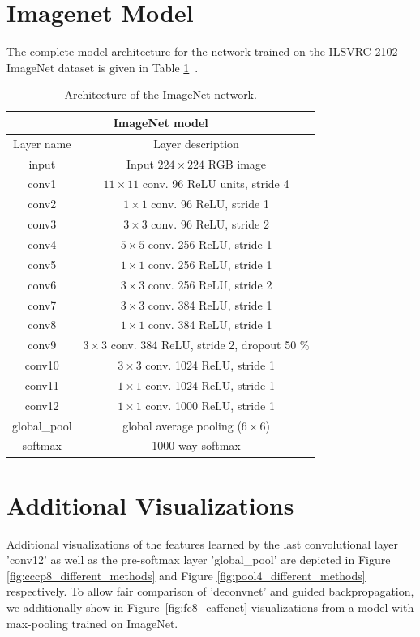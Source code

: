 \documentclass{article} %
\begin{document}
\begin{appendix}
\section{Imagenet Model}
The complete model architecture for the network trained on the ILSVRC-2102 ImageNet dataset is given in Table \ref{tbl:imagenet_net}~.
\newpage
\begin{table}[ht]
\caption{Architecture of the ImageNet network.}
\label{tbl:imagenet_net}
\begin{center}
\begin{tabular}{c|c}
\multicolumn{2}{c}{\textbf{ImageNet model}} \\ \hline
Layer name & Layer description \\ \hline
input & Input $224 \times 224$ RGB image\\
conv1 & $11 \times 11$ conv. 96 ReLU units, stride 4\\
conv2 & $1 \times 1$ conv. 96 ReLU, stride 1\\
conv3 & $3 \times 3$ conv. 96 ReLU, stride 2\\
conv4 & $5 \times 5$ conv. 256 ReLU, stride 1\\
conv5 & $1 \times 1$ conv. 256 ReLU, stride 1\\
conv6 & $3 \times 3$ conv. 256 ReLU, stride 2\\
conv7 & $3 \times 3$ conv. 384 ReLU, stride 1\\
conv8 & $1 \times 1$ conv. 384 ReLU, stride 1\\
conv9 & $3 \times 3$ conv. 384 ReLU, stride 2, dropout 50 \%\\
conv10 & $3 \times 3$ conv. 1024 ReLU, stride 1\\
conv11 & $1 \times 1$ conv. 1024 ReLU, stride 1\\
conv12 & $1 \times 1$ conv. 1000 ReLU, stride 1\\
global\_pool & global average pooling ($6 \times 6$)\\
softmax & 1000-way softmax
\end{tabular}
\end{center}
\end{table}

\section{Additional Visualizations}
Additional visualizations of the features learned by the last convolutional layer 'conv12' as well as the pre-softmax layer 'global\_pool' are depicted in Figure \ref{fig:cccp8_different_methods} and Figure \ref{fig:pool4_different_methods} respectively. To allow fair comparison of 'deconvnet' and guided backpropagation, we additionally show in Figure~\ref{fig:fc8_caffenet} visualizations from a model with max-pooling trained on ImageNet.


\end{appendix}
\end{document}
